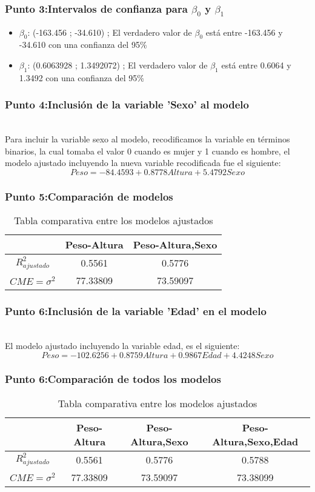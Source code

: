 \documentclass[12pt]{beamer}
\begin{document}
\begin{frame}
\frametitle{Punto 3:Intervalos de confianza para $\beta_{0}$ y $\beta_{1}$}
\begin{itemize}
\item $\beta_{0}$: (-163.456 ; -34.610)  ; El verdadero valor de $\beta_{0}$ está entre -163.456 y -34.610 con una confianza del 95\%
\item $\beta_{1}$: (0.6063928 ; 1.3492072) ; El verdadero valor de $\beta_{1}$ está entre 0.6064 y 1.3492 con una confianza del 95\%
\end{itemize}

\end{frame}
\begin{frame}
\frametitle{Punto 4:Inclusión de la variable 'Sexo' al modelo}
~\\ Para incluir la variable sexo al modelo, recodificamos la variable en términos binarios, la cual tomaba el valor 0 cuando es mujer y 1 cuando es hombre, el modelo ajustado incluyendo la nueva variable recodificada fue el siguiente:
~\\ $$Peso=-84.4593+0.8778 Altura +  5.4792 Sexo $$
\end{frame}
\begin{frame}
\frametitle{Punto 5:Comparación de modelos}
\begin{table}[!htb]
\caption{Tabla comparativa entre los modelos ajustados}\label{Tabla1}
\begin{center}
\begin{tabular}{ccc}
\hline
 & Peso-Altura & Peso-Altura,Sexo \\ 
\hline
$R^2_{ajustado}$ & 0.5561 & 0.5776 \\ 
 
$CME=\sigma^2$ & 77.33809 & 73.59097 \\ 
\hline 
\end{tabular}
\end{center}
\end{table}
\end{frame}

\begin{frame}
\frametitle{Punto 6:Inclusión de la variable 'Edad' en el modelo}
~\\ El modelo ajustado incluyendo la variable edad, es el siguiente:
~\\ $$Peso=-102.6256+0.8759 Altura +0.9867 Edad +4.4248 Sexo $$
\end{frame}

\begin{frame}
\frametitle{Punto 6:Comparación de todos los modelos}
\begin{table}[!htb]
\centering
\caption{Tabla comparativa entre los modelos ajustados}\label{Tabla1}
\resizebox{12cm}{!} {
\begin{tabular}{cccc}
\hline
 &Peso-Altura&Peso-Altura,Sexo&Peso-Altura,Sexo,Edad \\ 
\hline
$R^2_{ajustado}$ &0.5561&0.5776&0.5788 \\ 
 
$CME=\sigma^2$ &77.33809&73.59097&73.38099 \\ 
\hline 
\end{tabular}
}
\end{table}
\end{frame}
\end{document}
